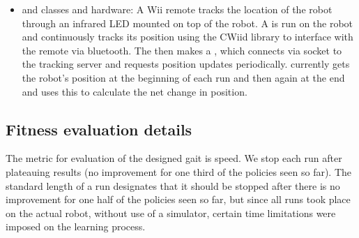\begin{itemize}
\item {} and  classes and
  hardware: A Wii remote tracks the location of the robot through an
  infrared LED mounted on top of the robot. A  is
  run on the robot and continuously tracks its position using the
  CWiid library\cite{cwiid} to interface with the remote via
  bluetooth.  The  then makes a
  , which connects via socket to the tracking
  server and requests position updates periodically.
   currently gets the robot's position at the
  beginning of each run and then again at the end and uses this to
  calculate the net change in position.

\end{itemize}



\subsection{Fitness evaluation details}




The metric for evaluation of the designed gait is speed. We stop each 
run after plateauing results (no improvement for one third of the 
policies seen so far). The standard length of a run designates that it
should be stopped after there is no improvement for one half of the policies
seen so far, but since all runs took place on the actual robot, without use
of a simulator, certain time limitations were imposed on the learning process.

